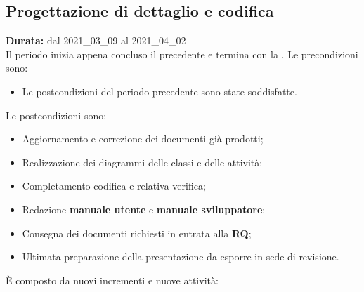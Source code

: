 \subsection{Progettazione di dettaglio e codifica}
\label{progettazione_di_dettaglio}
\textbf{Durata:} dal 2021\_03\_09 al 2021\_04\_02 \\
Il periodo inizia appena concluso il precedente e termina con la .
Le precondizioni sono:
\begin{itemize}
    \item Le postcondizioni del periodo precedente sono state soddisfatte.
\end{itemize}
Le postcondizioni sono:
\begin{itemize}
    \item Aggiornamento e correzione dei documenti già prodotti;
    \item Realizzazione dei diagrammi delle classi e delle attività;
    \item Completamento codifica e relativa verifica;
    \item Redazione \textbf{manuale utente} e \textbf{manuale sviluppatore};
    \item Consegna dei documenti richiesti in entrata alla \textbf{RQ};
    \item Ultimata preparazione della presentazione da esporre in sede di revisione.
\end{itemize}
È composto da nuovi incrementi e nuove attività:
